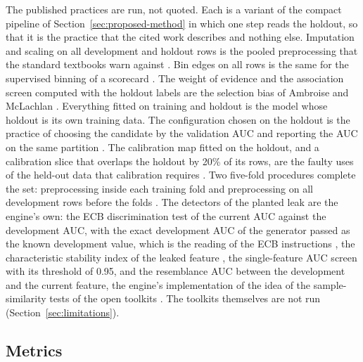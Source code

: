 The published practices are run, not quoted. Each is a variant of the compact pipeline of Section~\ref{sec:proposed-method} in which one step reads the holdout, so that it is the practice that the cited work describes and nothing else. Imputation and scaling on all development and holdout rows is the pooled preprocessing that the standard textbooks warn against \citep{hastie2009,moscovich2022}. Bin edges on all rows is the same for the supervised binning of a scorecard \citep{siddiqi2017}. The weight of evidence and the association screen computed with the holdout labels are the selection bias of Ambroise and McLachlan \citep{ambroise2002}. Everything fitted on training and holdout is the model whose holdout is its own training data. The configuration chosen on the holdout is the practice of choosing the candidate by the validation AUC and reporting the AUC on the same partition \citep{cawley2010,autobayesian2026}. The calibration map fitted on the holdout, and a calibration slice that overlaps the holdout by 20\% of its rows, are the faulty uses of the held-out data that calibration requires \citep{niculescu2005,zadrozny2002}. Two five-fold procedures complete the set: preprocessing inside each training fold and preprocessing on all development rows before the folds \citep{ambroise2002,varma2006}. The detectors of the planted leak are the engine's own: the ECB discrimination test of the current AUC against the development AUC, with the exact development AUC of the generator passed as the known development value, which is the reading of the ECB instructions \citep{ecb2019}, the characteristic stability index of the leaked feature \citep{yurdakul2020}, the single-feature AUC screen with its threshold of 0.95, and the resemblance AUC between the development and the current feature, the engine's implementation of the idea of the sample-similarity tests of the open toolkits \citep{mercury2023,probatus2026}. The toolkits themselves are not run (Section~\ref{sec:limitations}).

\subsection{Metrics}

